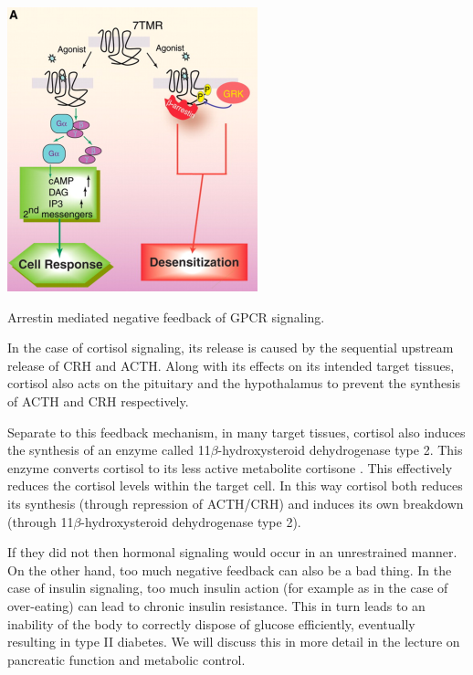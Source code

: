\documentclass{tufte-handout}
\begin{document}
\begin{marginfigure}[-13cm]
  \includegraphics{figures/arrestins}
  \caption{Arrestin mediated negative feedback of GPCR signaling.}
    \label{fig:arrestins}
\end{marginfigure}

  In the case of cortisol signaling, its release is caused by the sequential upstream release of CRH and ACTH.  Along with its effects on its intended target tissues, cortisol also acts on the pituitary and the hypothalamus to prevent the synthesis of ACTH and CRH respectively.  

Separate to this feedback mechanism, in many target tissues, cortisol also induces the synthesis of an enzyme called 11$\beta$-hydroxysteroid dehydrogenase type 2.  This enzyme converts cortisol to its less active metabolite cortisone \cite{Hubener1956}.  This effectively reduces the cortisol levels within the target cell.  In this way cortisol both reduces its synthesis (through repression of ACTH/CRH) and induces its own breakdown (through 11$\beta$-hydroxysteroid dehydrogenase type 2).

  If they did not then hormonal signaling would occur in an unrestrained manner.  On the other hand, too much negative feedback can also be a bad thing.  In the case of insulin signaling, too much insulin action (for example as in the case of over-eating) can lead to chronic insulin resistance.  This in turn leads to an inability of the body to correctly dispose of glucose efficiently, eventually resulting in type II diabetes.  We will discuss this in more detail in the lecture on pancreatic function and metabolic control.
\end{document}

